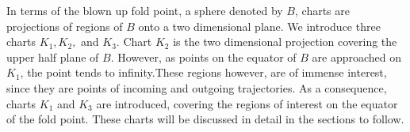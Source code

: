 In terms of the blown up fold point, a sphere denoted by $B$, charts are projections of regions of $B$ onto a two dimensional plane. 
We introduce three charts $ K_1,K_2,$ and $K_3 $. Chart $K_2$ is the two dimensional projection covering the upper half plane of $B$. However, as points on the equator of $B$ are approached on $K_1$, the point tends to infinity.These regions however, are of immense interest, since they are points of incoming and outgoing trajectories. As a consequence, charts $K_1$ and $K_3$ are introduced, covering the regions of interest on the equator of the fold point. These charts will be discussed in detail in the sections to follow.

